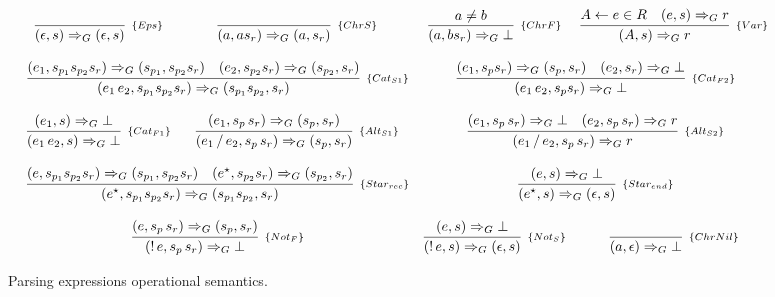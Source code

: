 \begin{figure*}[!ht]
   \[
      \begin{array}{cccc}
         \infer[_{\{Eps\}}]{(\epsilon,s)\Rightarrow_G (\epsilon,s)}{} &
         \infer[_{\{ChrS\}}]{(a,as_r) \Rightarrow_G (a,s_r)}{}  &
         \infer[_{\{ChrF\}}]{(a,bs_r) \Rightarrow_G \bot}{a \neq b} &
         \infer[_{\{Var\}}]{(A,s) \Rightarrow_G r}
                           {A \leftarrow e \in R & (e,s) \Rightarrow_G r} \\ \\
         \multicolumn{2}{c}{
            \infer[_{\{Cat_{S1}\}}]{(e_1\,e_2,s_{p_1}s_{p_2}s_r) \Rightarrow_G (s_{p_1}s_{p_2}, s_r)}
                                 {(e_1,s_{p_1}s_{p_2}s_r) \Rightarrow_G (s_{p_1},s_{p_2}s_r) &
                                 (e_2,s_{p_2}s_r)\Rightarrow_G (s_{p_2},s_r)}
         } &
         \multicolumn{2}{c}{
            \infer[_{\{Cat_{F2}\}}]{(e_1\,e_2,s_ps_r) \Rightarrow_G \bot}
                                 { (e_1,s_ps_r) \Rightarrow_G (s_p,s_r) &
                                    (e_2,s_r) \Rightarrow_G \bot}} \\ \\
         \infer[_{\{Cat_{F1}\}}]{(e_1\,e_2,s)\Rightarrow_G \bot}{(e_1,s) \Rightarrow_G \bot} &
         \infer[_{\{Alt_{S1}\}}]{(e_1\,/\,e_2,s_p\,s_r) \Rightarrow_G (s_p,s_r)}
                                {(e_1,s_p\,s_r)\Rightarrow_G (s_p,s_r)} &
         \multicolumn{2}{c}{
            \infer[_{\{Alt_{S2}\}}]{(e_1\,/\,e_2,s_p\,s_r) \Rightarrow_G r}
                                  {(e_1,s_p\,s_r)\Rightarrow_G \bot &
                                   (e_2,s_p\,s_r)\Rightarrow_G r}
         } \\ \\
         \multicolumn{2}{c}{
            \infer[_{\{Star_{rec}\}}]{(e^\star,s_{p_1}s_{p_2}s_r) \Rightarrow_G (s_{p_1}s_{p_2},s_r)}
                                 {(e,s_{p_1}s_{p_2}s_r) \Rightarrow_G (s_{p_1},s_{p_2}s_r) &
                                  (e^\star, s_{p_2}s_r) \Rightarrow_G (s_{p_2},s_r)}
         } &
         \multicolumn{2}{c}{
            \infer[_{\{Star_{end}\}}]{(e^\star,s) \Rightarrow_G (\epsilon,s)}
                                    {(e,s) \Rightarrow_G \bot}} \\ \\
         \multicolumn{2}{c}{
            \infer[_{\{Not_F\}}]{(!\,e,s_p\,s_r) \Rightarrow_G \bot}
                               {(e,s_p\,s_r) \Rightarrow_G (s_p,s_r)}
         } &
         \infer[_{\{Not_S\}}]{(!\,e,s) \Rightarrow_G (\epsilon,s)}
         {(e,s) \Rightarrow_G \bot}
           &
         \infer[_{\{ChrNil\}}]{(a,\epsilon) \Rightarrow_G \bot}{}
      \end{array}
   \]
   \centering
   \caption{Parsing expressions operational semantics.}
   \label{fig:pegsemantics}
\end{figure*}
